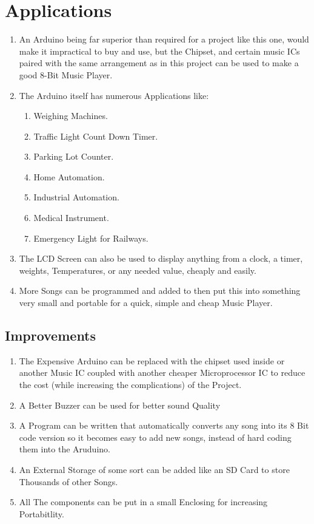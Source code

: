 \documentclass[11pt]{article}
\begin{document}
\section{Applications}
\begin{enumerate}
\item An Arduino being far superior than required for a project like this one, would make it impractical to buy and use, but the Chipset, and certain music ICs paired with the same arrangement as in this project can be used to make a good 8-Bit Music Player.
\item The Arduino itself has numerous Applications like: 
\begin{enumerate}
	\item Weighing Machines.
	\item Traffic Light Count Down Timer.
	\item Parking Lot Counter.
	\item Home Automation.
	\item Industrial Automation.
	\item Medical Instrument.
	\item Emergency Light for Railways.
\end{enumerate}

\item The LCD Screen can also be used to display anything from a clock,
a timer, weights, Temperatures, or any needed value, cheaply and easily.
\item More Songs can be programmed and added to then put this into something very small and
portable for a quick, simple and cheap Music Player.

\end{enumerate}


\subsection{Improvements}
\begin{enumerate}
	\item The Expensive Arduino can be replaced with the
	chipset used inside or another Music IC coupled
	with another cheaper Microprocessor IC to reduce
	the cost (while increasing the complications) of the
	Project.

	\item A Better Buzzer can be used for better sound
	Quality
	
	\item A Program can be written that automatically
	converts any song into its 8 Bit code version so it
	becomes easy to add new songs, instead of hard
	coding them into the Aruduino.
	
	\item An External Storage of some sort can be added like
	an SD Card to store Thousands of other Songs.
	
	\item All The components can be put in a small Enclosing
	for increasing Portabitlity.

\end{enumerate}
\end{document}
